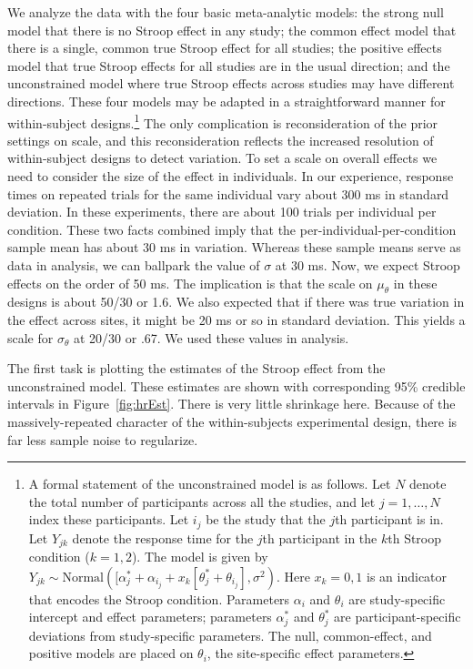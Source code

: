 \documentclass[english,man]{apa6}
\theoremstyle{definition}
\theoremstyle{definition}
\theoremstyle{remark}
\begin{document}
We analyze the data with the four basic meta-analytic models: the strong
null model that there is no Stroop effect in any study; the common
effect model that there is a single, common true Stroop effect for all
studies; the positive effects model that true Stroop effects for all
studies are in the usual direction; and the unconstrained model where
true Stroop effects across studies may have different directions. These
four models may be adapted in a straightforward manner for
within-subject designs.\footnote{A formal statement of the unconstrained
  model is as follows. Let \(N\) denote the total number of participants
  across all the studies, and let \(j=1,\ldots,N\) index these
  participants. Let \(i_j\) be the study that the \(j\)th participant is
  in. Let \(Y_{jk}\) denote the response time for the \(j\)th
  participant in the \(k\)th Stroop condition (\(k=1,2\)). The model is
  given by
  \(Y_{jk}\sim \mbox{Normal}([\alpha^*_j+\alpha_{i_j}+x_k[\theta^*_j+\theta_{i_j}],\sigma^2)\).
  Here \(x_k=0,1\) is an indicator that encodes the Stroop condition.
  Parameters \(\alpha_i\) and \(\theta_i\) are study-specific intercept
  and effect parameters; parameters \(\alpha^*_j\) and \(\theta^*_j\)
  are participant-specific deviations from study-specific parameters.
  The null, common-effect, and positive models are placed on
  \(\theta_i\), the site-specific effect parameters.} The only
complication is reconsideration of the prior settings on scale, and this
reconsideration reflects the increased resolution of within-subject
designs to detect variation. To set a scale on overall effects we need
to consider the size of the effect in individuals. In our experience,
response times on repeated trials for the same individual vary about 300
ms in standard deviation. In these experiments, there are about 100
trials per individual per condition. These two facts combined imply that
the per-individual-per-condition sample mean has about 30 ms in
variation. Whereas these sample means serve as data in analysis, we can
ballpark the value of \(\sigma\) at 30 ms. Now, we expect Stroop effects
on the order of 50 ms. The implication is that the scale on
\(\mu_\theta\) in these designs is about 50/30 or 1.6. We also expected
that if there was true variation in the effect across sites, it might be
20 ms or so in standard deviation. This yields a scale for
\(\sigma_\theta\) at 20/30 or .67. We used these values in analysis.

The first task is plotting the estimates of the Stroop effect from the
unconstrained model. These estimates are shown with corresponding 95\%
credible intervals in Figure~\ref{fig:hrEst}. There is very little
shrinkage here. Because of the massively-repeated character of the
within-subjects experimental design, there is far less sample noise to
regularize.
\end{document}
